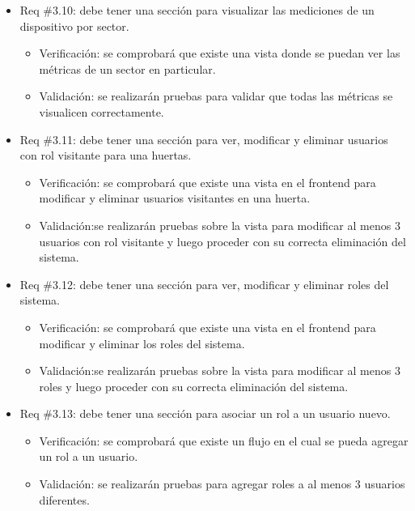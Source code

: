 \documentclass[
11pt, %
codirector, %
]{charter}
\begin{document}
\begin{itemize}
\begin{itemize}
	\item Req \#3.10: debe tener una sección para visualizar las mediciones de un dispositivo por sector.
		\begin{itemize}
		\item Verificación: se comprobará que existe una vista donde se puedan ver las métricas de un sector en particular.
		\item Validación: se realizarán pruebas para validar que todas las métricas se visualicen correctamente.\\
		\end{itemize}
		
	\item Req \#3.11: debe tener una sección para ver, modificar y eliminar usuarios con rol visitante para una huertas.
		\begin{itemize}
		\item Verificación: se comprobará que existe una vista en el frontend para modificar y eliminar usuarios visitantes en una huerta.
		\item Validación:se realizarán pruebas sobre la vista para modificar al menos 3 usuarios con rol visitante y luego proceder con su correcta eliminación del sistema.\\
		\end{itemize}
		
	\item Req \#3.12: debe tener una sección para ver, modificar y eliminar roles del sistema.
		\begin{itemize}
		\item Verificación: se comprobará que existe una vista en el frontend para modificar y eliminar los roles del sistema.
		\item Validación:se realizarán pruebas sobre la vista para modificar al menos 3 roles y luego proceder con su correcta eliminación del sistema.\\
		\end{itemize}
		
	\item Req \#3.13: debe tener una sección para asociar un rol a un usuario nuevo.
		\begin{itemize}
		\item Verificación: se comprobará que existe un flujo en el cual se pueda agregar un rol a un usuario.
		\item Validación: se realizarán pruebas para agregar roles a al menos 3 usuarios diferentes.\\
		\end{itemize}
		

\end{itemize}
\end{itemize}
\end{document}
